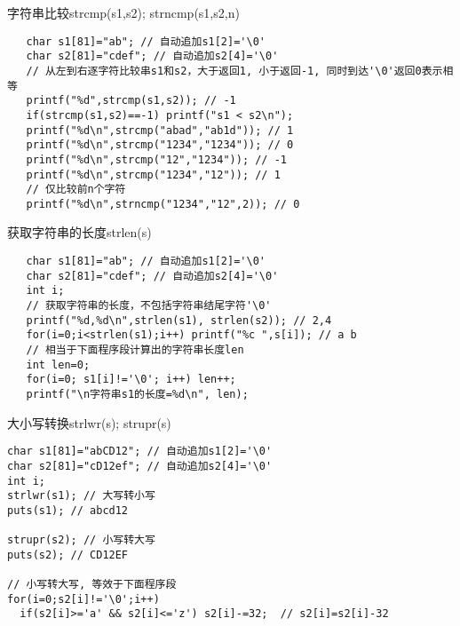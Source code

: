 
\begin{frame}{字符串比较strcmp(s1,s2); strncmp(s1,s2,n)}
\begin{lstlisting}
   char s1[81]="ab"; // 自动追加s1[2]='\0'
   char s2[81]="cdef"; // 自动追加s2[4]='\0'
   // 从左到右逐字符比较串s1和s2，大于返回1, 小于返回-1, 同时到达'\0'返回0表示相等
   printf("%d",strcmp(s1,s2)); // -1
   if(strcmp(s1,s2)==-1) printf("s1 < s2\n");
   printf("%d\n",strcmp("abad","ab1d")); // 1
   printf("%d\n",strcmp("1234","1234")); // 0
   printf("%d\n",strcmp("12","1234")); // -1
   printf("%d\n",strcmp("1234","12")); // 1  
   // 仅比较前n个字符
   printf("%d\n",strncmp("1234","12",2)); // 0
\end{lstlisting}
\end{frame}


\begin{frame}{获取字符串的长度strlen(s)}
\begin{lstlisting}
   char s1[81]="ab"; // 自动追加s1[2]='\0'
   char s2[81]="cdef"; // 自动追加s2[4]='\0'
   int i;
   // 获取字符串的长度，不包括字符串结尾字符'\0'
   printf("%d,%d\n",strlen(s1), strlen(s2)); // 2,4
   for(i=0;i<strlen(s1);i++) printf("%c ",s[i]); // a b
   // 相当于下面程序段计算出的字符串长度len
   int len=0;
   for(i=0; s1[i]!='\0'; i++) len++;
   printf("\n字符串s1的长度=%d\n", len);
\end{lstlisting}
\end{frame}


\begin{frame}{大小写转换strlwr(s); strupr(s)}
\begin{lstlisting}
char s1[81]="abCD12"; // 自动追加s1[2]='\0'
char s2[81]="cD12ef"; // 自动追加s2[4]='\0'
int i;
strlwr(s1); // 大写转小写
puts(s1); // abcd12
 
strupr(s2); // 小写转大写
puts(s2); // CD12EF

// 小写转大写, 等效于下面程序段
for(i=0;s2[i]!='\0';i++)
  if(s2[i]>='a' && s2[i]<='z') s2[i]-=32;  // s2[i]=s2[i]-32
\end{lstlisting}
\end{frame}

